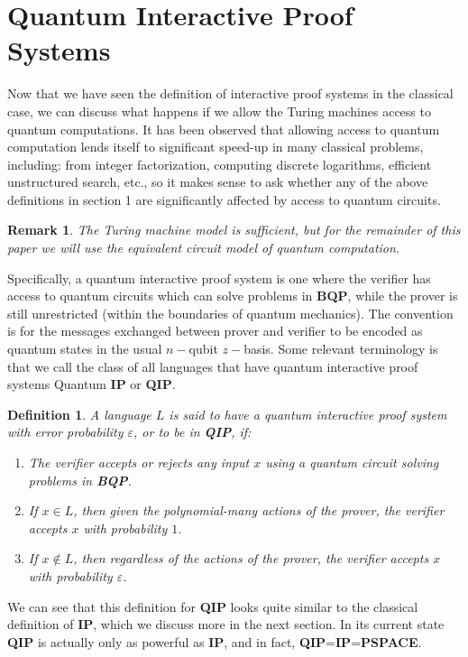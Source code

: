 \documentclass[12pt]{article}
\newtheorem*{defn}{Definition}
\newtheorem*{rmk}{Remark}
\begin{document}
    \section{Quantum Interactive Proof Systems}
    Now that we have seen the definition of interactive proof systems in the classical case, we can discuss what happens if we allow the Turing machines access to quantum computations. It has been observed that allowing access to quantum computation lends itself to significant speed-up in many classical problems, including: from integer factorization, computing discrete logarithms, efficient unstructured search, etc., so it makes sense to ask whether any of the above definitions in section 1 are significantly affected by access to quantum circuits.
   
    \begin{rmk}The Turing machine model is sufficient, but for the remainder of this paper we will use the equivalent circuit model of quantum computation. \end{rmk}
    
    Specifically, a quantum interactive proof system is one where the verifier has access to quantum circuits which can solve problems in \textbf{BQP}, while the prover is still unrestricted (within the boundaries of quantum mechanics). The convention is for the messages exchanged between prover and verifier to be encoded as quantum states in the usual $n-$qubit $z-$basis. Some relevant terminology is that we call the class of all languages that have quantum interactive proof systems Quantum \textbf{IP} or \textbf{QIP}.
    \begin{defn}
    	A language $L$ is said to have a quantum interactive proof system with error probability $\varepsilon$, or to be in \textbf{QIP}, if:
    	\begin{enumerate}
    		\item The verifier accepts or rejects any input $x$ using a quantum circuit solving problems in \textbf{BQP}.
    		\item If $x\in L$, then given the polynomial-many actions of the prover, the verifier accepts $x$ with probability $1$.
    		\item If $x\notin L$, then regardless of the actions of the prover, the verifier accepts $x$ with probability $\varepsilon$.
    	\end{enumerate}
    \end{defn}

	We can see that this definition for \textbf{QIP} looks quite similar to the classical definition of \textbf{IP}, which we discuss more in the next section. In its current state \textbf{QIP} is actually only as powerful as \textbf{IP}, and in fact, \textbf{QIP}=\textbf{IP}=\textbf{PSPACE}. 
\end{document}
